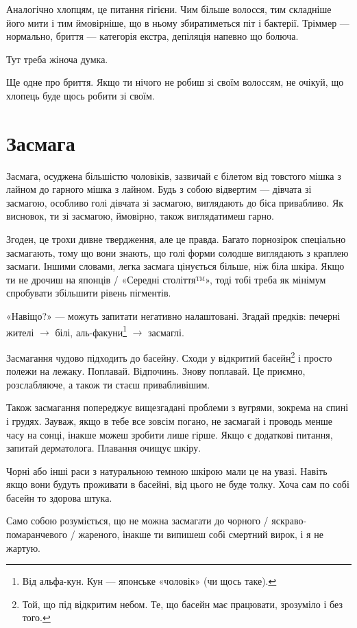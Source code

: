 Аналогічно хлопцям, це питання гігієни. Чим більше волосся, тим складніше його
мити і тим ймовірніше, що в ньому збиратиметься піт і бактерії. Тріммер —
нормально, бриття — категорія екстра, депіляція напевно що болюча.

Тут треба жіноча думка.

Ще одне про бриття. Якщо ти нічого не робиш зі своїм волоссям, не очікуй, що
хлопець буде щось робити зі своїм.

\section{Засмага}
Засмага, осуджена більшістю чоловіків, зазвичай є білетом від товстого
мішка з лайном до гарного мішка з лайном. Будь з собою відвертим — дівчата
зі засмагою, особливо голі дівчата зі засмагою, виглядають до біса привабливо.
Як висновок, ти зі засмагою, ймовірно, також виглядатимеш гарно.

Згоден, це трохи дивне твердження, але це правда. Багато порнозірок спеціально
засмагають, тому що вони знають, що голі форми солодше виглядають з краплею
засмаги. Іншими словами, легка засмага цінується більше, ніж біла шкіра. Якщо
ти не дрочиш на японців / «Середні століття™», тоді тобі треба як мінімум
спробувати збільшити рівень пігментів.

«Навіщо?» — можуть запитати негативно налаштовані. Згадай предків: печерні
жителі $\rightarrow$ білі, аль-факуни\footnote{Від альфа-кун. Кун — японське
«чоловік» (чи щось таке).} $\rightarrow$ засмаглі.

Засмагання чудово підходить до басейну. Сходи у відкритий басейн\footnote{Той,
що під відкритим небом. Те, що басейн має працювати, зрозуміло і без того.} і
просто полежи на лежаку. Поплавай. Відпочинь. Знову поплавай. Це приємно,
розслабляюче, а також ти стаєш привабливішим.

Також засмагання попереджує вищезгадані проблеми з вугрями, зокрема на спині
і грудях. Зауваж, якщо в тебе все зовсім погано, не засмагай і проводь менше
часу на сонці, інакше можеш зробити лише гірше. Якщо є додаткові питання,
запитай дерматолога. Плавання очищує шкіру.

Чорні або інші раси з натуральною темною шкірою мали це на увазі. Навіть якщо
вони будуть проживати в басейні, від цього не буде толку. Хоча сам по собі
басейн то здорова штука.

Само собою розуміється, що не можна засмагати до чорного / яскраво-
помаранчевого / жареного, інакше ти випишеш собі смертний вирок, і я не жартую.

